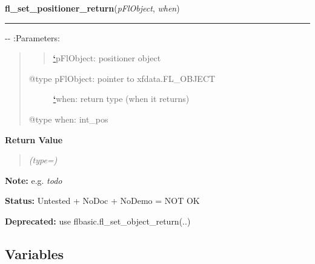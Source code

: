 \hspace{.8\funcindent}\begin{boxedminipage}{\funcwidth}

    \raggedright \textbf{fl\_set\_positioner\_return}(\textit{pFlObject}, \textit{when})

    \vspace{-1.5ex}

    \rule{\textwidth}{0.5\fboxrule}
\setlength{\parskip}{2ex}

-{}-
:Parameters:
%
\begin{quote}
%
\begin{quote}

%
\hyperlink{id1}{\textbf{\color{red}`}}pFlObject: positioner object

\end{quote}
%
\begin{description}
\item[{@type pFlObject: pointer to xfdata.FL\_OBJECT}] \leavevmode 
%
\hyperlink{id3}{\textbf{\color{red}`}}when: return type (when it returns)

\end{description}

@type when: int\_pos

\end{quote}
\setlength{\parskip}{1ex}
      \textbf{Return Value}
    \vspace{-1ex}

      \begin{quote}
      {\it (type=)}

      \end{quote}

\textbf{Note:} 
e.g. \emph{todo}


\textbf{Status:} 
Untested + NoDoc + NoDemo = NOT OK


\textbf{Deprecated:} 
use flbasic.fl\_set\_object\_return(..)


    \end{boxedminipage}



  \subsection{Variables}

